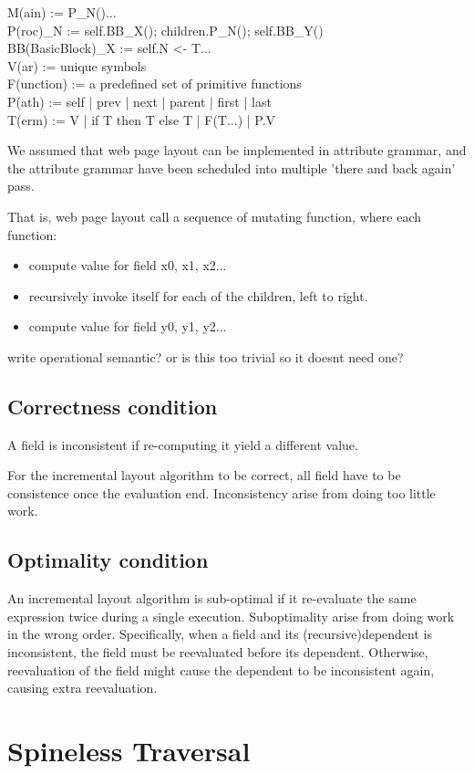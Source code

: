 \documentclass[format=acmsmall, review=false, screen=true]{acmart}
\begin{document}
M(ain) := P\_N()... \\
P(roc)\_N := self.BB\_X(); children.P\_N(); self.BB\_Y() \\
BB(BasicBlock)\_X := self.N <- T... \\
V(ar) := unique symbols \\
F(unction) := a predefined set of primitive functions \\
P(ath) := self | prev | next | parent | first | last \\
T(erm) := V | if T then T else T | F(T...) | P.V

We assumed that web page layout can be implemented in attribute grammar, and the attribute grammar have been scheduled into multiple 'there and back again' pass.

That is, web page layout call a sequence of mutating function, where each function:
\begin{itemize}
	\item compute value for field x0, x1, x2...
	\item recursively invoke itself for each of the children, left to right.
	\item compute value for field y0, y1, y2...
\end{itemize}

write operational semantic? or is this too trivial so it doesnt need one?

\subsection{Correctness condition}
A field is inconsistent if re-computing it yield a different value.

For the incremental layout algorithm to be correct, all field have to be consistence once the evaluation end. Inconsistency arise from doing too little work.

\subsection{Optimality condition}
An incremental layout algorithm is sub-optimal if it re-evaluate the same expression twice during a single execution. Suboptimality arise from doing work in the wrong order. Specifically, when a field and its (recursive)dependent is inconsistent, the field must be reevaluated before its dependent. Otherwise, reevaluation of the field might cause the dependent to be inconsistent again, causing extra reevaluation.

\section{Spineless Traversal}
\end{document}

